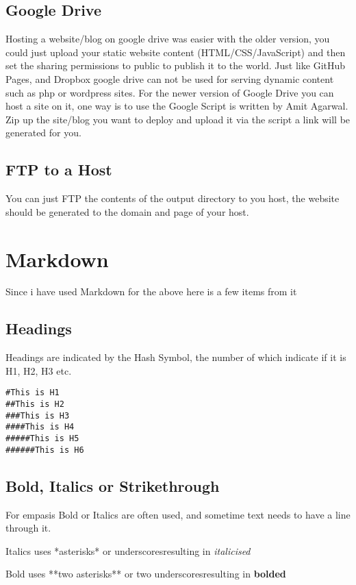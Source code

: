 \documentclass[12pt]{article}			%
\begin{document}
\subsection{Google Drive}
Hosting a website/blog on google drive was easier with the older version, you could just upload your static website content (HTML/CSS/JavaScript) and then set the sharing permissions to public to publish it to the world. Just like GitHub Pages, and Dropbox google drive can not be used for serving dynamic content such as php or wordpress sites.
For the newer version of Google Drive you can host a site on it, one way is to use the Google Script is written by Amit Agarwal. Zip up the site/blog you want to deploy and upload it via the script a link will be generated for you.

\subsection{FTP to a Host}
You can just FTP the contents of the output directory to you host, the website should be generated to the domain and page of your host.




\newpage
\section{Markdown}
Since i have used Markdown for the above here is a few items from it

\subsection{Headings}
Headings are indicated by the Hash Symbol, the number of which indicate if it is H1, H2, H3 etc.
\begin{verbatim}
#This is H1
##This is H2
###This is H3
####This is H4
#####This is H5
######This is H6
\end{verbatim}
\subsection{Bold, Italics or Strikethrough}
For empasis Bold or Italics are often used, and sometime text needs to have a line through it.\par
Italics uses *asterisks* or \textunderscore underscores\textunderscore resulting in \textit{italicised} \par
Bold uses **two asterisks** or \textunderscore\textunderscore two underscores\textunderscore\textunderscore resulting in \textbf{bolded} \par
\end{document}
